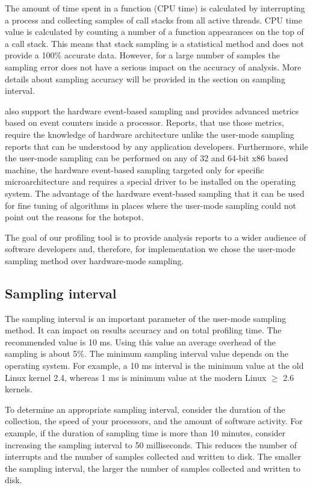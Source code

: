\documentclass[a4paper]{jpconf}
\begin{document}
The amount of time spent in a function (CPU time) is calculated by interrupting a process and collecting samples of 
call stacks from all active threads. CPU time value is calculated by counting a number of  a function appearances on 
the top of a call stack. This means that stack sampling is a statistical method and does not provide a 100\% accurate 
data. However, for a large number of samples the sampling error does not have a serious impact on the accuracy of 
analysis. More details about sampling accuracy will be provided in the section on sampling interval.

\amp also support the hardware event-based sampling and provides advanced metrics based on event counters inside 
a processor. Reports, that use those metrics,  require the knowledge of hardware architecture  unlike the user-mode 
sampling reports that can be understood by any application developers. Furthermore, while the user-mode sampling can 
be performed on any of 32 and 64-bit x86 based machine, the hardware event-based sampling targeted only for specific 
\intel microarchitecture and requires a special driver to be installed on the operating system. The advantage of 
the hardware event-based sampling that it can be used for fine tuning of algorithms in places where  the user-mode 
sampling could not point out the reasons for the hotspot.

The goal of our profiling tool is to provide analysis reports to a wider audience of software developers and, therefore, 
for implementation we chose the user-mode sampling method over hardware-mode sampling.

\subsection{Sampling interval}

The sampling interval is an important parameter of the user-mode sampling method. It can impact on results accuracy and 
on total profiling time. The recommended value is 10 ms. Using this value an average overhead of the sampling 
is about 5\%.  The minimum sampling interval value depends on the operating system. For example, a 10 ms interval 
is the minimum value at the old Linux kernel 2.4, whereas 1 ms is minimum value at the modern Linux $\ge$ 2.6 kernels.

To determine an appropriate sampling interval, consider the duration of the collection, the speed of your processors, 
and the amount of software activity. For example, if the duration of sampling time is more than 10 minutes, 
consider increasing the sampling interval to 50 milliseconds. This reduces the number of interrupts and 
the number of samples collected and written to disk. The smaller the sampling interval, the larger the number of samples 
collected and written to disk.
\end{document}

